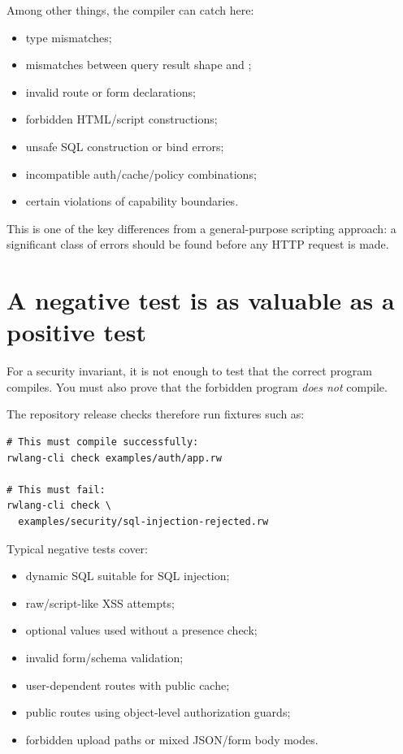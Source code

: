 Among other things, the compiler can catch here:

\begin{itemize}
  \item type mismatches;
  \item mismatches between query result shape and ;
  \item invalid route or form declarations;
  \item forbidden HTML/script constructions;
  \item unsafe SQL construction or bind errors;
  \item incompatible auth/cache/policy combinations;
  \item certain violations of capability boundaries.
\end{itemize}

This is one of the key differences from a general-purpose scripting approach: a significant class of errors should be found before any HTTP request is made.

\section{A negative test is as valuable as a positive test}

For a security invariant, it is not enough to test that the correct program compiles. You must also prove that the forbidden program \emph{does not} compile.

The repository release checks therefore run fixtures such as:

\begin{lstlisting}
# This must compile successfully:
rwlang-cli check examples/auth/app.rw

# This must fail:
rwlang-cli check \
  examples/security/sql-injection-rejected.rw
\end{lstlisting}

Typical negative tests cover:

\begin{itemize}
  \item dynamic SQL suitable for SQL injection;
  \item raw/script-like XSS attempts;
  \item optional values used without a presence check;
  \item invalid form/schema validation;
  \item user-dependent routes with public cache;
  \item public routes using object-level authorization guards;
  \item forbidden upload paths or mixed JSON/form body modes.
\end{itemize}


